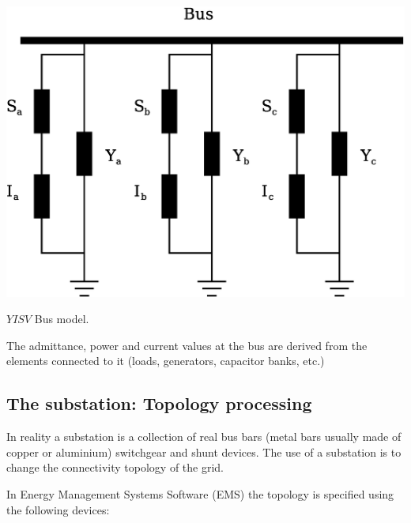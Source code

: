 \documentclass[nols,a4paper,twoside,notoc,fleqn]{tufte-book}
\begin{document}
\begin{marginfigure}
	\includegraphics[width=0.99\linewidth]{img/NodeElements.eps}
	\caption{$YISV$ Bus model.}
	\label{bus_model}
\end{marginfigure}

The admittance, power and current values at the bus are derived from the elements connected to it (loads, generators, capacitor banks, etc.)


\subsection{The substation: Topology processing}
\label{TopologyProcessing}
In reality a substation is a collection of real bus bars (metal bars usually made of copper or aluminium) switchgear and shunt devices. The use of a substation is to change the connectivity topology of the grid.

In Energy Management Systems Software (EMS) the topology is specified using the following devices:
\end{document}

